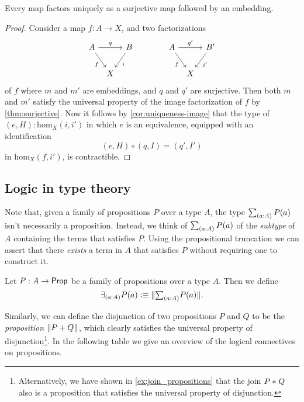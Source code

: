 \begin{cor}
  Every map factors uniquely as a surjective map followed by an embedding.
\end{cor}

\begin{proof}
  Consider a map $f:A\to X$, and two factorizations
  \begin{equation*}
    \begin{tikzcd}[column sep=tiny]
      A \arrow[rr,"q"] \arrow[dr,swap,"f"] & & B \arrow[dl,"i"] &[3em] A \arrow[rr,"{q'}"] \arrow[dr,swap,"f"] & & B' \arrow[dl,"{i'}"] \\
      & X & & & X
    \end{tikzcd}
  \end{equation*}
  of $f$ where $m$ and $m'$ are embeddings, and $q$ and $q'$ are surjective. Then both $m$ and $m'$ satisfy the universal property of the image factorization of $f$ by \cref{thm:surjective}. Now it follows by \cref{cor:uniqueness-image} that the type of $(e,H):\mathrm{hom}_X(i,i')$ in which $e$ is an equivalence, equipped with an identification
  \begin{equation*}
    (e,H)\circ(q,I)=(q',I')
  \end{equation*}
  in $\mathrm{hom}_X(f,i')$, is contractible.
\end{proof}

\subsection{Logic in type theory}
Note that, given a family of propositions $P$ over a type $A$, the type $\sm{a:A}P(a)$ isn't necessarily a proposition. Instead, we think of $\sm{a:A}P(a)$ of the \emph{subtype} of $A$ containing the terms that satisfies $P$. Using the propositional truncation we can assert that there \emph{exists} a term in $A$ that satisfies $P$ without requiring one to construct it. 

\begin{defn}
Let $P:A\to \mathsf{Prop}$ be a family of propositions over a type $A$. Then we define
\begin{equation*}
\exists_{(a:A)}P(a)\defeq \brck{\sm{a:A}P(a)}.
\end{equation*}
\end{defn}

Similarly, we can define the disjunction of two propositions $P$ and $Q$ to be the \emph{proposition} $\Vert P+Q\Vert_{}$, which clearly satisfies the universal property of disjunction\footnote{Alternatively, we have shown in \cref{ex:join_propositions} that the join ${P}\ast_{}{Q}$ also is a proposition that satisfies the universal property of disjunction.}. In the following table we give an overview of the logical connectives on propositions.


